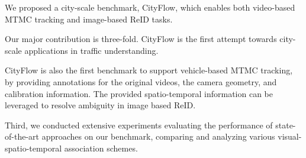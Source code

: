 We proposed a city-scale benchmark, CityFlow, which
enables both video-based MTMC tracking and image-based
ReID tasks. 

Our major contribution is three-fold.
	CityFlow is the first attempt towards city-scale applications
in traffic understanding. 
	
	CityFlow is also the first benchmark to
support vehicle-based MTMC tracking, by providing annotations for the original videos, the camera geometry, and
calibration information. The provided spatio-temporal information can be leveraged to resolve ambiguity in image based ReID.
	
	Third, we conducted extensive experiments
evaluating the performance of state-of-the-art approaches
on our benchmark, comparing and analyzing various visual-spatio-temporal association schemes. 
	